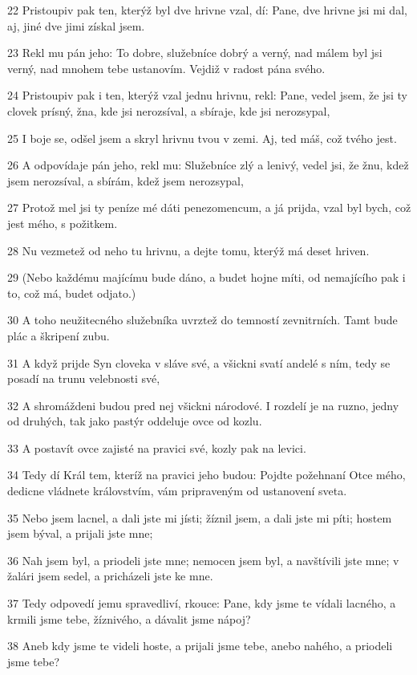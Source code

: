 \par 22 Pristoupiv pak ten, kterýž byl dve hrivne vzal, dí: Pane, dve hrivne jsi mi dal, aj, jiné dve jimi získal jsem.
\par 23 Rekl mu pán jeho: To dobre, služebníce dobrý a verný, nad málem byl jsi verný, nad mnohem tebe ustanovím. Vejdiž v radost pána svého.
\par 24 Pristoupiv pak i ten, kterýž vzal jednu hrivnu, rekl: Pane, vedel jsem, že jsi ty clovek prísný, žna, kde jsi nerozsíval, a sbíraje, kde jsi nerozsypal,
\par 25 I boje se, odšel jsem a skryl hrivnu tvou v zemi. Aj, ted máš, což tvého jest.
\par 26 A odpovídaje pán jeho, rekl mu: Služebníce zlý a lenivý, vedel jsi, že žnu, kdež jsem nerozsíval, a sbírám, kdež jsem nerozsypal,
\par 27 Protož mel jsi ty peníze mé dáti penezomencum, a já prijda, vzal byl bych, což jest mého, s požitkem.
\par 28 Nu vezmetež od neho tu hrivnu, a dejte tomu, kterýž má deset hriven.
\par 29 (Nebo každému majícímu bude dáno, a budet hojne míti, od nemajícího pak i to, což má, budet odjato.)
\par 30 A toho neužitecného služebníka uvrztež do temností zevnitrních. Tamt bude plác a škripení zubu.
\par 31 A když prijde Syn cloveka v sláve své, a všickni svatí andelé s ním, tedy se posadí na trunu velebnosti své,
\par 32 A shromáždeni budou pred nej všickni národové. I rozdelí je na ruzno, jedny od druhých, tak jako pastýr oddeluje ovce od kozlu.
\par 33 A postavít ovce zajisté na pravici své, kozly pak na levici.
\par 34 Tedy dí Král tem, kteríž na pravici jeho budou: Pojdte požehnaní Otce mého, dedicne vládnete královstvím, vám pripraveným od ustanovení sveta.
\par 35 Nebo jsem lacnel, a dali jste mi jísti; žíznil jsem, a dali jste mi píti; hostem jsem býval, a prijali jste mne;
\par 36 Nah jsem byl, a priodeli jste mne; nemocen jsem byl, a navštívili jste mne; v žalári jsem sedel, a pricházeli jste ke mne.
\par 37 Tedy odpovedí jemu spravedliví, rkouce: Pane, kdy jsme te vídali lacného, a krmili jsme tebe, žíznivého, a dávalit jsme nápoj?
\par 38 Aneb kdy jsme te videli hoste, a prijali jsme tebe, anebo nahého, a priodeli jsme tebe?

